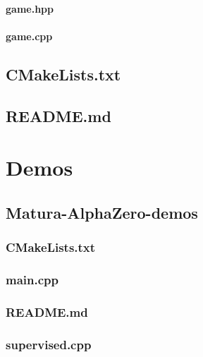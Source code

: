 \documentclass[12pt]{article}
\newcommand{\incFile}[2]{\label{code:#2}}
\newcommand{\incDemo}[2]{\label{demo:#2}}
\begin{document}
\paragraph{game.hpp}													\incFile{C++}{games/othello/game.hpp}
\paragraph{game.cpp}													\incFile{C++}{games/othello/game.cpp}

\subsection{CMakeLists.txt}											\incFile{python}{CMakeLists.txt}
\subsection{README.md}												\incFile{python}{README.md}

\section{Demos}
\subsection{Matura-AlphaZero-demos}
\subsubsection{CMakeLists.txt}										\incDemo{python}{CMakeLists.txt}
\subsubsection{main.cpp}												\incDemo{c++}{main.cpp}
\subsubsection{README.md}										\incDemo{python}{README.md}
\subsubsection{supervised.cpp}									\incDemo{c++}{supervised.cpp}
\end{document}

